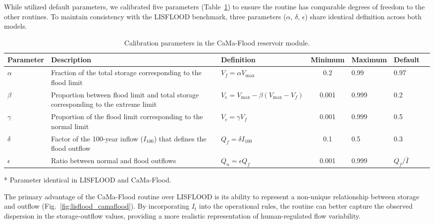 \documentclass[hess, manuscript]{copernicus}
\begin{document}
While \citet{Hanazaki2022} utilized default parameters, we calibrated five parameters (Table~\ref{tab:parameters_camaflood}) to ensure the routine has comparable degrees of freedom to the other routines. To maintain consistency with the LISFLOOD benchmark, three parameters ($\alpha$, $\delta$, $\epsilon$) share identical definition across both models.

\begin{table}[t]
    \centering
    \begin{threeparttable}
        \caption{Calibration parameters in the CaMa-Flood reservoir module.}
        \label{tab:parameters_camaflood}
        \begin{tabularx}{\textwidth}{lXlclll}
            \toprule
            \textbf{Parameter} & \textbf{Description} & \textbf{Definition} & \textbf{Minimum} & \textbf{Maximum} & \textbf{Default} \\
            \midrule
            $\alpha$\tnote{*} & Fraction of the total storage corresponding to the flood limit & $V_f = \alpha V_{\max}$ & 0.2 & 0.99 & 0.97 \\
            $\beta$ & Proportion between flood limit and total storage corresponding to the extreme limit & $V_e = V_{\max} - \beta (V_{\max} - V_f)$ & 0.001 & 0.999 & 0.2 \\
            $\gamma$ & Proportion of the flood limit corresponding to the normal limit & $V_c = \gamma V_f$ & 0.001 & 0.999 & 0.5 \\
            $\delta$\tnote{*} & Factor of the 100-year inflow ($I_{100}$) that defines the flood outflow & $Q_f = \delta I_{100}$ & 0.1 & 0.5 & 0.3 \\
            $\epsilon$\tnote{*} & Ratio between normal and flood outflows & $Q_n = \epsilon Q_f$ & 0.001 & 0.999 & $Q_f / \bar{I}$ \\
             \bottomrule
        \end{tabularx}
        \begin{tablenotes}
            \small
            \item{*} Parameter identical in LISFLOOD and CaMa-Flood.
        \end{tablenotes}
    \end{threeparttable}
\end{table}

The primary advantage of the CaMa-Flood routine over LISFLOOD is its ability to represent a non-unique relationship between storage and outflow (Fig.~\ref{fig:lisflood_camaflood}). By incorporating $I_t$ into the operational rules, the routine can better capture the observed dispersion in the storage-outflow values, providing a more realistic representation of human-regulated flow variability.
\end{document}
